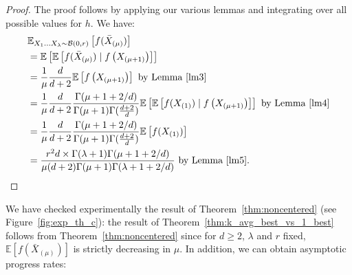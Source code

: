 \begin{proof}
The proof follows by applying our various lemmas and integrating over all possible values for $h$. We have:
\begin{align*}
&\mathbb{E}_{X_{1}\ldots X_{\lambda}\sim\mathcal{B}(0,r)}\left[ f(\bar X_{(\mu)})\right]\\
&=\mathbb{E}\left[\mathbb{E}\left[ f(\bar X_{(\mu)})\mid f\left(X_{(\mu+1)}\right)\right]\right]\\
&=\frac{1}{\mu}\frac{d}{d+2}\mathbb{E}\left[ f\left(X_{(\mu+1)}\right)\right]\mbox{  by Lemma \ref{lm3}}\\
&=\frac{1}{\mu}\frac{d}{d+2} \frac{\Gamma(\mu+1+2/d)}{\Gamma(\mu+1)\Gamma(\frac{d+2}{d})}\mathbb{E}\left[\mathbb{E}\left[ f( X_{(1)})\mid f\left(X_{(\mu+1)}\right)\right]\right]\mbox{ by Lemma \ref{lm4}}\\
&=\frac{1}{\mu}\frac{d}{d+2} \frac{\Gamma(\mu+1+2/d)}{\Gamma(\mu+1)\Gamma(\frac{d+2}{d})}\mathbb{E}\left[ f( X_{(1)})\right]\\
&=\frac{r^2d\times\Gamma(\lambda+1)\Gamma(\mu+1+2/d)}{\mu(d+2)\Gamma(\mu+1)\Gamma(\lambda+1+2/d)}\mbox{ by Lemma~\ref{lm5}}.
\end{align*}
\end{proof}
We have checked experimentally the result of Theorem~\ref{thm:noncentered} (see Figure~\ref{fig:exp_th_c}): the result of Theorem~\ref{thm:k_avg_best_vs_1_best} follows from Theorem~\ref{thm:noncentered} since for $d\geq2$, $\lambda$ and $r$ fixed, $\mathbb{E}\left[ f(\bar X_{(\mu)})\right]$ is strictly decreasing in $\mu$. In addition, we can obtain asymptotic progress rates:
